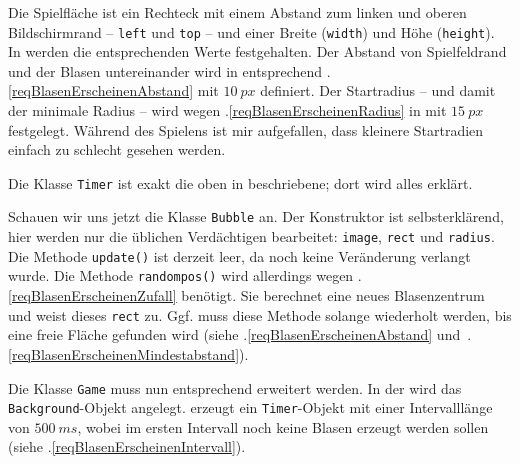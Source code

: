 Die Spielfläche ist ein Rechteck mit einem Abstand zum linken und oberen Bildschirmrand -- \texttt{left} und \texttt{top} -- und einer Breite (\texttt{width}) und Höhe (\texttt{height}). In  werden die entsprechenden Werte festgehalten. Der Abstand von Spielfeldrand und der Blasen untereinander wird in  entsprechend .\ref{reqBlasenErscheinenAbstand} mit $10~px$ definiert. Der Startradius -- und damit der minimale Radius -- wird wegen .\ref{reqBlasenErscheinenRadius} in  mit $15~px$ festgelegt. Während des Spielens ist mir aufgefallen, dass kleinere Startradien einfach zu schlecht gesehen werden.


Die Klasse \texttt{Timer} ist exakt die oben in  beschriebene; dort wird alles erklärt.


Schauen wir uns jetzt die Klasse \texttt{Bubble} an. Der Konstruktor ist selbsterklärend, hier werden nur die üblichen Verdächtigen bearbeitet: \texttt{image}, \texttt{rect} und \texttt{radius}. Die Methode \texttt{update()} ist derzeit leer, da noch keine Veränderung verlangt wurde. Die Methode \texttt{randompos()} wird allerdings wegen .\ref{reqBlasenErscheinenZufall} benötigt. Sie berechnet eine neues Blasenzentrum und weist dieses \texttt{rect} zu. Ggf. muss diese Methode solange wiederholt werden, bis eine freie Fläche gefunden wird (siehe .\ref{reqBlasenErscheinenAbstand} und~.\ref{reqBlasenErscheinenMindestabstand}).


Die Klasse \texttt{Game} muss nun entsprechend erweitert werden. In der  wird das \texttt{Background}-Objekt angelegt.  erzeugt ein \texttt{Timer}-Objekt mit einer Intervalllänge von $500~ms$, wobei im ersten Intervall noch keine Blasen erzeugt werden sollen (siehe .\ref{reqBlasenErscheinenIntervall}).

